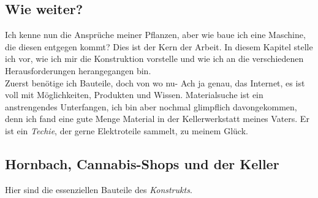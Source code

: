 \documentclass[12pt,titlepage,a4paper]{article}
\begin{document}
\clearpage

\subsection{Wie weiter?}
Ich kenne nun die Ansprüche meiner Pflanzen, aber wie baue ich eine Maschine, die diesen entgegen kommt? Dies ist der Kern der Arbeit. In diesem Kapitel stelle ich vor, wie ich mir die Konstruktion vorstelle und wie ich an die verschiedenen Herausforderungen herangegangen bin.\\ Zuerst benötige ich Bauteile, doch von wo nu- Ach ja genau, das Internet, es ist voll mit Möglichkeiten, Produkten und Wissen.
Materialsuche ist ein anstrengendes Unterfangen, ich bin aber nochmal glimpflich davongekommen, denn ich fand  eine gute Menge Material in der Kellerwerkstatt meines Vaters. Er ist ein \textit{Techie}, der gerne Elektroteile sammelt, zu meinem Glück.

\subsection{Hornbach, Cannabis-Shops und der Keller}
Hier sind die essenziellen Bauteile des \textit{Konstrukts}.
\end{document}
